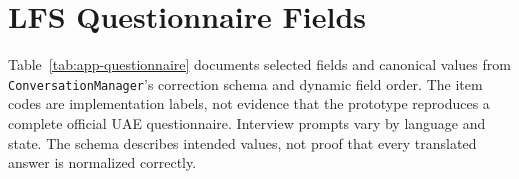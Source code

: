 \appendix
\chapter{LFS Questionnaire Fields}
\label{app:questionnaire}

Table~\ref{tab:app-questionnaire} documents selected fields and canonical
values from \texttt{ConversationManager}'s correction schema and dynamic
field order. The item codes are implementation labels, not evidence that
the prototype reproduces a complete official UAE questionnaire. Interview
prompts vary by language and state. The schema describes intended values,
not proof that every translated answer is normalized correctly.

\begingroup
\setlength{\tabcolsep}{3pt}
\footnotesize
\renewcommand{\arraystretch}{1.35}
